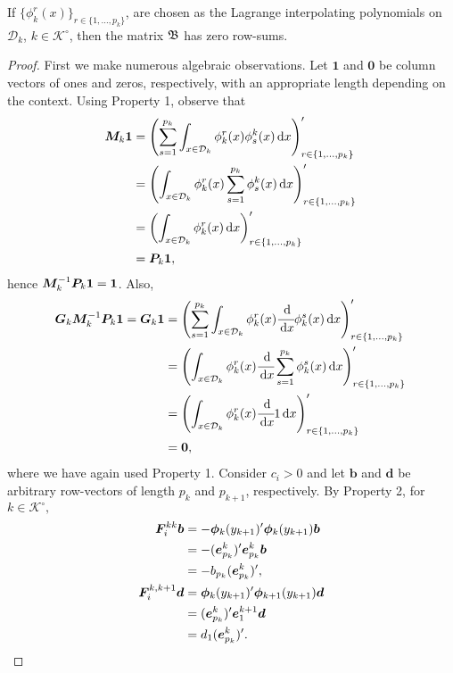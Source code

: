 \begin{lem}
	If \(\{\phi^r_k(x)\}_{r\in\{1,...,p_k\}}\), are chosen as the Lagrange interpolating polynomials on \(\mathcal D_k\), \(k\in\mathcal K^\circ\), then the matrix \( {  {\mathfrak{\boldsymbol B}}}\) has zero row-sums. 
\end{lem}
\begin{proof}
	First we make numerous algebraic observations. Let \(\boldsymbol 1\) and \(\boldsymbol 0\) be column vectors of ones and zeros, respectively, with an appropriate length depending on the context. Using Property 1, observe that 
	\begin{align*}
        \boldsymbol M_k\boldsymbol 1 &= \left(\sum_{s=1}^{p_k} \int_{x\in\mathcal{D}_k}\phi^r_k(x)\phi_s^k(x)\, \mathrm{d} x\right)_{r\in\{1,...,p_k\}}'{}
        \\&= \left(\int_{x\in\mathcal{D}_k}\phi^r_k(x)\sum_{s=1}^{p_k} \phi_s^k(x)\, \mathrm{d} x \right)_{r\in\{1,...,p_k\}} '{}
        \\&= \left(\int_{x\in\mathcal{D}_k}\phi^r_k(x)\, \mathrm{d} x\right)_{r\in\{1,...,p_k\}} '{}
        \\&= \boldsymbol P_k\boldsymbol 1,
	\end{align*}
	hence \(\boldsymbol M_k^{-1}\boldsymbol P_k\boldsymbol 1=\boldsymbol 1\). Also, 
	\begin{align*}
        \boldsymbol G_k\boldsymbol M_k^{-1}\boldsymbol P_k\boldsymbol 1 = \boldsymbol G_k\boldsymbol 1 &= \left(\sum_{s=1}^{p_k} \int_{x\in\mathcal{D}_k}\phi^r_k(x)\cfrac{\, \mathrm{d} }{\, \mathrm{d} x}\phi_k^s(x)\, \mathrm{d} x\right)_{r\in\{1,...,p_k\}} '{}
        \\&= \left(\int_{x\in\mathcal{D}_k}\phi^r_k(x)\cfrac{\, \mathrm{d} }{\, \mathrm{d} x}\sum_{s=1}^{p_k} \phi_k^s(x)\, \mathrm{d} x \right)_{r\in\{1,...,p_k\}} '{}
        \\&= \left(\int_{x\in\mathcal{D}_k}\phi^r_k(x)\cfrac{\, \mathrm{d} }{\, \mathrm{d} x}1\, \mathrm{d} x\right)_{r\in\{1,...,p_k\}} '{}
        \\&= \boldsymbol 0,
	\end{align*}
	where we have again used Property 1. Consider \(c_i>0\) and let \(\boldsymbol b\) and \(\boldsymbol d\) be arbitrary row-vectors of length \(p_k\) and \(p_{k+1}\), respectively. By Property 2, for \(k\in\mathcal K^\circ,\)
	\begin{align*}
        \bs F_i^{kk}\boldsymbol b &= -\boldsymbol \phi_k(y_{k+1})\tr{} \boldsymbol \phi_k(y_{k+1})\boldsymbol b \\&= -(\bs e^k_{p_k})\tr{} \bs e_{p_k}^k\bs b \\&= -b_{p_k}(\boldsymbol e_{p_k}^k)\tr{},
        \\\bs F_i^{k,k+1}\boldsymbol d &= \boldsymbol \phi_{k}(y_{k+1})\tr{} \boldsymbol \phi_{k+1}(y_{k+1})\boldsymbol d \\&= (\bs e^{k}_{p_k})\tr{} \bs e_{1}^{k+1}\bs d \\&= d_{1}(\boldsymbol e_{p_{k}}^{k})\tr{}.

\end{align*}
\end{proof}
